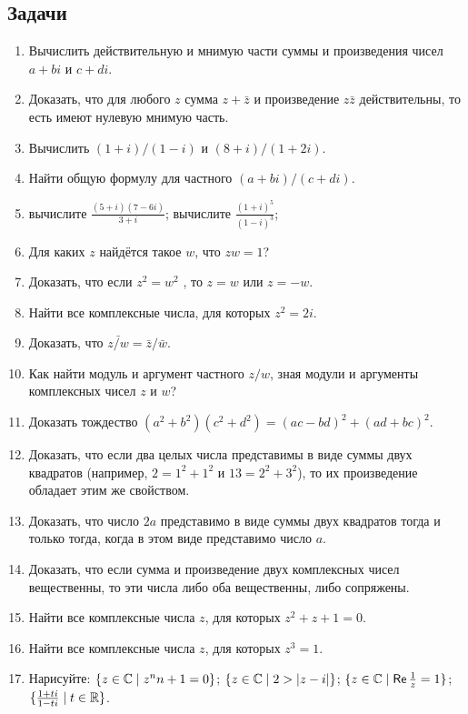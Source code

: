 \subsection*{Задачи}

\begin{enumerate}
\item Вычислить действительную и мнимую части суммы и произведения чисел $a + bi$ и $c + di$.
\item Доказать, что для любого $z$ сумма $z + \bar z$ и произведение $z\bar z$ действительны, то есть имеют нулевую мнимую часть.
\item Вычислить $(1 + i)/(1 - i)$ и $(8 + i)/(1 + 2i)$.
\item Найти общую формулу для частного $(a + bi)/(c + di)$.
\item 
 \ipunkt  вычислите $\frac{(5+i)(7-6i)}{3+i}$;
 \ipunkt  вычислите $\frac{(1+i)^5}{(1-i)^3}$;
\item Для каких $z$ найдётся такое $w$, что $zw = 1$?
\item Доказать, что если $z^2 = w^2$ , то $z = w$ или $z = -w$.
\item Найти все комплексные числа, для которых $z^2 = 2i$.
\item Доказать, что $\bar{z/w} = \bar z/\bar w$.
\item Как найти  модуль и аргумент частного $z/w$, зная модули и
аргументы комплексных чисел $z$ и $w$?
\item Доказать тождество $(a^2 +b^2)(c^2 +d^2) = (ac-bd)^2 +(ad+bc)^2$.
\item Доказать, что если два целых числа представимы в виде
суммы двух квадратов (например, $2 = 1^2 + 1^2$ и $13 = 2^2 + 3^2$), то их
произведение обладает этим же свойством.
\item Доказать, что число $2a$ представимо в виде суммы двух
квадратов тогда и только тогда, когда в этом виде представимо
число $a$.
\item Доказать, что если сумма и произведение двух комплексных чисел вещественны,
 то эти числа либо оба вещественны, либо сопряжены.
\item Найти все комплексные числа $z$, для которых $z^2 + z + 1 = 0$.
\item Найти все комплексные числа $z$, для которых $z^3 = 1$.
\item  Нарисуйте: \ipunkt  $\{z \in \mathbb C \mid z^nn + 1 = 0\}$; \ipunkt  $\{z \in \mathbb C \mid 2 > |z - i|\}$; \ipunkt  $\{z \in \mathbb C \mid \mathop{\textsf{Re}} \frac{1}{z} = 1\}$; \ipunkt  $\{ \frac{1+ti}{1-ti} \mid t \in \mathbb R\}$.

\end{enumerate}





